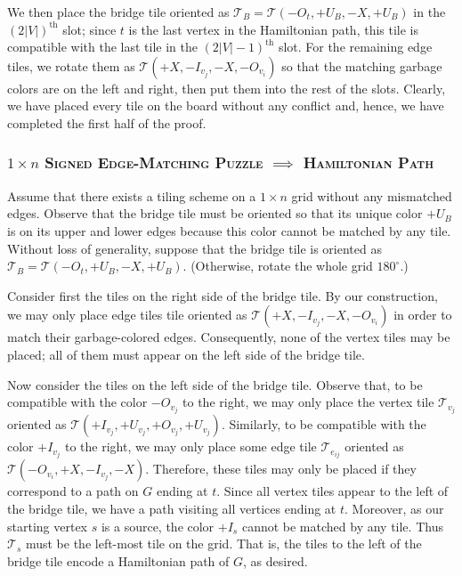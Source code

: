 \documentclass[11pt]{article}
\begin{document}
We then place the bridge tile oriented as $\mathcal{T}_B=\mathcal{T}(-O_t,+U_B,-X,+U_B)$ in the $(2|V|)^\textrm{th}$ slot; since $t$ is the last vertex in the Hamiltonian path, this tile is compatible with the last tile in the $(2|V|-1)^\textrm{th}$ slot. For the remaining edge tiles, we rotate them as $\mathcal{T}(+X, -I_{v_j}, -X, -O_{v_i})$ so that the matching garbage colors are on the left and right, then put them into the rest of the slots. Clearly, we have placed every tile on the board without any conflict and, hence, we have completed the first half of the proof.

\subsubsection*{\textsc{$1 \times n$ Signed Edge-Matching Puzzle} $\implies$ \textsc{Hamiltonian Path}}

Assume that there exists a tiling scheme on a $1 \times n$ grid without any mismatched edges. Observe that the bridge tile must be oriented so that its unique color $+U_B$ is on its upper and lower edges because this color cannot be matched by any tile. Without loss of generality, suppose that the bridge tile is oriented as $\mathcal{T}_B=\mathcal{T}(-O_t,+U_B,-X,+U_B)$. (Otherwise, rotate the whole grid $180^{\circ}$.)

Consider first the tiles on the right side of the bridge tile. By our construction, we may only place edge tiles tile oriented as $\mathcal{T}(+X, -I_{v_j}, -X,-O_{v_i})$ in order to match their garbage-colored edges. Consequently, none of the vertex tiles may be placed; all of them must appear on the left side of the bridge tile.

Now consider the tiles on the left side of the bridge tile. Observe that, to be compatible with the color $-O_{v_j}$ to the right, we may only place the vertex tile $\mathcal{T}_{v_j}$ oriented as $\mathcal{T}(+I_{v_j}, +U_{v_j}, +O_{v_j}, +U_{v_j})$. Similarly, to be compatible with the color $+I_{v_j}$ to the right, we may only place some edge tile $\mathcal{T}_{e_{ij}}$ oriented as $\mathcal{T}(-O_{v_i}, +X, -I_{v_j}, -X)$. Therefore, these tiles may only be placed if they correspond to a path on $G$ ending at $t$. Since all vertex tiles appear to the left of the bridge tile, we have a path visiting all vertices ending at $t$. Moreover, as our starting vertex $s$ is a source, the color $+I_{s}$ cannot be matched by any tile. Thus $\mathcal{T}_s$ must be the left-most tile on the grid. That is, the tiles to the left of the bridge tile encode a Hamiltonian path of $G$, as desired.
\end{document}
